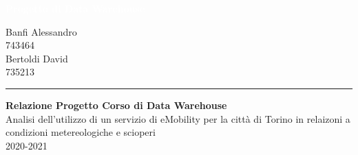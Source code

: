 \documentclass[12pt,a4paper,oneside]{report}
\author{%
    Banfi Alessandro \\
    743464 \\
    -\\
    Bertoldi David \\
    735213 \\
    -\\
    }
\begin{document}
\begin{titlepage}
\BgThispage
{}
\vspace*{0.4\textheight}
\noindent
\textcolor{white}{\Huge\textbf{\textsf{Progetto di Data Warehouse}}}
\vspace*{2cm}\par
\noindent
\begin{minipage}{0.35\linewidth}
    \begin{flushright}
        {%
    Banfi Alessandro \\
    743464 \\[2\baselineskip]
    
    Bertoldi David \\
    735213 
    
    }
    \end{flushright}
\end{minipage} \hspace{35pt}
%
\begin{minipage}{0.02\linewidth}
    \rule{1pt}{175pt}
\end{minipage} \hspace{10pt}
%
\begin{minipage}{0.63\linewidth}
\vspace{5pt}
    {\Huge\textbf{Relazione Progetto Corso di Data Warehouse\\[10pt]}}
   	Analisi dell'utilizzo di un servizio di eMobility per la città di Torino
	in relaizoni a condizioni metereologiche e scioperi
    \\ 2020-2021
\end{minipage}
\end{titlepage}
\restoregeometry


\newpage\tableofcontents\newpage







\end{document}
